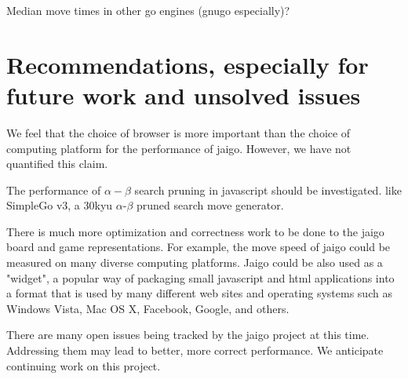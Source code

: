 \documentclass{memoir}
\begin{document}
Median move times in other go engines (gnugo especially)?

\chapter{Recommendations, especially for future work and unsolved issues}
We feel that the choice of browser is more important than the choice of computing platform for the performance of jaigo. However, we have not quantified this claim.

The performance of $\alpha-\beta$ search pruning in javascript should be investigated. like SimpleGo v3, a 30kyu $\alpha$-$\beta$ pruned search move generator.

There is much more optimization and correctness work to be done to the jaigo board and game representations. For example, the move speed of jaigo could be measured on many diverse computing platforms. Jaigo could be also used as a "widget", a popular way of packaging small javascript and html applications into a format that is used by many different web sites and operating systems such as Windows Vista, Mac OS X, Facebook, Google, and others.

There are many open issues being tracked by the jaigo project at this time. Addressing them may lead to better, more correct performance. We anticipate continuing work on this project.




\end{document}
